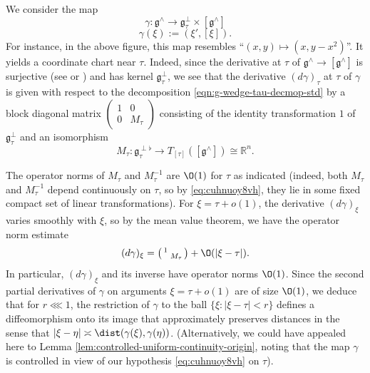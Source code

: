 We consider the map
\[
  \gamma : \mathfrak{g}^\wedge \rightarrow \mathfrak{g}_\tau^\perp \times [\mathfrak{g}^\wedge]\]
\[
  \gamma(\xi) := (\xi ', [\xi]).
\]
For instance, in the above figure, this map resembles ``$(x, y) \mapsto(x, y - x^2)$''.  It yields a coordinate chart near $\tau$.  Indeed, since the derivative at $\tau$ of $\mathfrak{g}^\wedge \rightarrow [\mathfrak{g}^\wedge]$ is surjective (see \cite[Thm 0.1]{MR0158024} or \cite[Theorem 13.5]{2020arXiv201202187N}) and has kernel $\mathfrak{g}_\tau^\perp$, we see that the derivative $(d \gamma)_\tau$ at $\tau$ of $\gamma$ is given with respect to the decomposition \eqref{eqn:g-wedge-tau-decmop-std} by a block diagonal matrix $\left(
  \begin{smallmatrix}
    1&0\\
    0 &M_\tau
  \end{smallmatrix}
\right)$ consisting of the identity transformation $1$ of $\mathfrak{g}_\tau^\perp$ and an isomorphism
\[M_\tau : \mathfrak{g}_\tau^{\perp \flat} \rightarrow T_{[\tau]}([\mathfrak{g}^\wedge]) \cong \mathbb{R}^n.\]

The operator norms of $M_\tau$ and $M_\tau^{-1}$ are $\O(1)$ for $\tau$ as indicated (indeed, both $M_\tau$ and $M_\tau^{-1}$ depend continuously on $\tau$, so by \eqref{eq:cuhnuoy8vh}, they lie in some fixed compact set of linear transformations).  For $\xi = \tau + o(1)$, the derivative $(d \gamma)_\xi$ varies smoothly with $\xi$, so by the mean value theorem, we have the operator norm estimate
\begin{equation}\label{eqn:estimate-d-gamma-xi-near-tau}
  (d \gamma)_{\xi}
  = \left(
    \begin{smallmatrix}
      1&\\
       &M_\tau
    \end{smallmatrix}
  \right) + \O(|\xi - \tau|).
\end{equation}
In particular, $(d \gamma)_{\xi}$ and its inverse have operator norms $\O(1)$.  Since the second partial derivatives of $\gamma$ on arguments $\xi = \tau + o(1)$ are of size $\O(1)$, we deduce that for $r \lll 1$, the restriction of $\gamma$ to the ball $\{\xi : |\xi - \tau| < r\}$ defines a diffeomorphism onto its image that approximately preserves distances in the sense that $|\xi-\eta| \asymp \dist(\gamma(\xi), \gamma(\eta))$.  (Alternatively, we could have appealed here to Lemma \ref{lem:controlled-uniform-continuity-origin}, noting that the map $\gamma$ is controlled in view of our hypothesis \eqref{eq:cuhnuoy8vh} on $\tau$).

